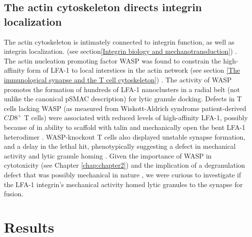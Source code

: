 \subsection{The actin cytoskeleton directs integrin localization}
\label{The actin cytoskeleton directs integrin localization}
The actin cytoskeleton is intimately connected to integrin function, as well as integrin localization. (see section\ref{Integrin biology and mechanotransduction}) \cite{Houmadi2018}. The actin nucleation promoting factor WASP was found to constrain the high-affinity form of LFA-1 to local interstices in the actin network (see section \ref{The immunological synapse and the T cell cytoskeleton}) \cite{Houmadi2018}. The activity of WASP promotes the formation of hundreds of LFA-1 nanoclusters in a radial belt (not unlike the canonical pSMAC description) for lytic granule docking. Defects in T cells lacking WASP (as measured from Wiskott-Aldrich syndrome patient-derived $CD8^{+}$ T cells) were associated with reduced levels of high-affinity LFA-1, possibly because of in ability to scaffold with talin and mechanically open the bent LFA-1 heterodimer \cite{Houmadi2018}. WASP-knockout T cells also displayed unstable synapse formation, and a delay in the lethal hit, phenotypically suggesting a defect in mechanical activity and lytic granule homing \cite{Houmadi2018}. Given the importance of WASP in cytotoxicity (see Chapter \ref{chap:chapter2}) \cite{Houmadi2018} and the implication of a degranulation defect that was possibly mechanical in nature \cite{Somersalo2004}, we were curious to investigate if the LFA-1 integrin's mechanical activity homed lytic granules to the synapse for fusion.

\section{Results}

